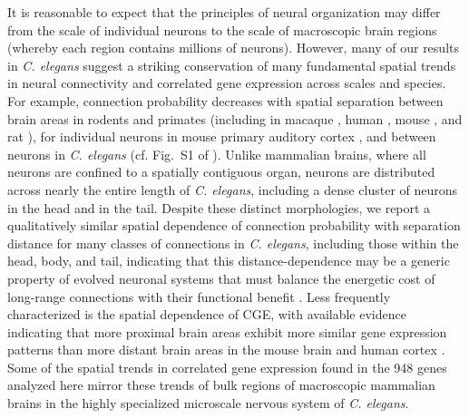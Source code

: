 \documentclass[10pt,letterpaper]{article}
\begin{document}
{%

It is reasonable to expect that the principles of neural organization may differ from the scale of individual neurons to the scale of macroscopic brain regions (whereby each region contains millions of neurons).
However, many of our results in \emph{C. elegans} suggest a striking conservation of many fundamental spatial trends in neural connectivity and correlated gene expression across scales and species.
For example, connection probability decreases with spatial separation between brain areas in rodents and primates \cite{Horvat:2016ia, Wang:2016gg} (including in macaque \cite{Markov:2013jo}, human \cite{Henderson:2014fg}, mouse \cite{Fulcher:2016ck}, and rat \cite{Noori:2017ce}), for individual neurons in mouse primary auditory cortex \cite{Levy:2012dy}, and between neurons in \emph{C. elegans} (cf. Fig.~S1 of \cite{Azulay:2016cg}).
Unlike mammalian brains, where all neurons are confined to a spatially contiguous organ, neurons are distributed across nearly the entire length of \emph{C. elegans}, including a dense cluster of neurons in the head and in the tail.
Despite these distinct morphologies, we report a qualitatively similar spatial dependence of connection probability with separation distance for many classes of connections in \emph{C. elegans}, including those within the head, body, and tail, indicating that this distance-dependence may be a generic property of evolved neuronal systems that must balance the energetic cost of long-range connections with their functional benefit \cite{Bullmore:2012vl, vandenHeuvel:2012kh, Kim:2014bu, Betzel:2016jt}.
Less frequently characterized is the spatial dependence of CGE, with available evidence indicating that more proximal brain areas exhibit more similar gene expression patterns than more distant brain areas in the mouse brain \cite{Fulcher:2016ck} and human cortex \cite{Krienen:2016eq, Pantazatos:2016ir, Richiardi:2017hb}.
Some of the spatial trends in correlated gene expression found in the 948 genes analyzed here mirror these trends of bulk regions of macroscopic mammalian brains in the highly specialized microscale nervous system of \emph{C. elegans}.
}
\end{document}
